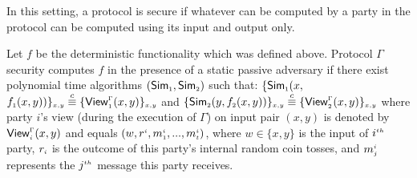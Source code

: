   
In this setting, a protocol is secure if whatever can be computed by a party in the protocol can be computed using its input and output only. 
 
 \vspace{-1mm}
 
\begin{definition}
Let $f$ be the deterministic functionality which was defined above. Protocol $\Gamma$ security computes $f$ in the presence of a static  passive adversary if there exist polynomial time algorithms $(\mathsf {Sim}_{\scriptscriptstyle 1}, \mathsf {Sim}_{\scriptscriptstyle 2})$ such that: 
%
{\small{
$
  \{\mathsf {Sim}_{\scriptscriptstyle 1}(x, $ $f_{\scriptscriptstyle 1}(x,y))\}_{\scriptscriptstyle x,y}\\\stackrel{c}{\equiv} \{\mathsf{View}_{\scriptscriptstyle 1}^{\scriptscriptstyle \Gamma}(x,y) \}_{\scriptscriptstyle x,y}$ and 
     $\{\mathsf{Sim}_{\scriptscriptstyle 2}(y, f_{\scriptscriptstyle 2}(x,y))\}_{\scriptscriptstyle x,y}\stackrel{c}{\equiv} \{\mathsf{View}_{\scriptscriptstyle 2}^{\scriptscriptstyle \Gamma}(x,y) \}_{\scriptscriptstyle x,y}
$}}
  where party $i$’s view (during the execution of $\Gamma$) on input pair  $(x, y)$ is denoted by $\mathsf{View}_{\scriptscriptstyle i}^{\scriptscriptstyle \Gamma}(x,y)$ and equals $(w, r^{\scriptscriptstyle i}, m_{\scriptscriptstyle 1}^{\scriptscriptstyle i}, ..., m_{\scriptscriptstyle t}^{\scriptscriptstyle i})$, where $w\in\{x,y\}$ is the input of $i^{\scriptscriptstyle th}$ party, $r_{\scriptscriptstyle i}$ is the outcome of this party's internal random coin tosses, and $m_{\scriptscriptstyle j}^{\scriptscriptstyle i}$ represents the $j^{\scriptscriptstyle th}$ message this party receives.  %
%
\end{definition}
 

  \vspace{-3mm}
  
